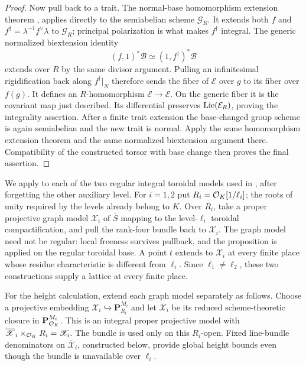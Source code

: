\begin{proof}
Now pull back to a trait. The normal-base homomorphism extension
theorem \cite[Chapter~I, Proposition~2.7]{FaltingsChai1990},
\cite[Proposition~3.3.1.5]{Lan2013} applies directly to the
semiabelian scheme $\mathcal G_R$. It extends both $f$ and
$f^\dagger=\lambda^{-1}f^\vee\lambda$ to $\mathcal G_R$;
principal polarization is what makes $f^\dagger$ integral.
The generic normalized biextension identity
\begin{equation}\label{ht:adjoint-biextension}
 (f,1)^*\mathscr B\simeq(1,f^\dagger)^*\mathscr B
\end{equation}
extends over $R$ by the same divisor argument. Pulling an
infinitesimal rigidification back along $f^\dagger|_N$ therefore
sends the fiber of $\mathcal E$ over $g$ to its fiber over $f(g)$.
It defines an $R$-homomorphism $\mathcal E\to\mathcal E$.
On the generic fiber it is the covariant map just described.
Its differential preserves $\operatorname{Lie}(\mathcal E_R)$, proving the
integrality assertion. After a finite trait extension the base-changed
group scheme is again semiabelian and the new trait is normal.
Apply the same homomorphism extension theorem and the same normalized
biextension argument there. Compatibility of the constructed torsor
with base change then proves the final assertion.
\end{proof}

We apply  to each of the two regular integral
toroidal models used in , after forgetting the other
auxiliary level. For $i=1,2$ put
$R_i=\mathcal O_K[1/\ell_i]$; the roots of unity required by the levels
already belong to $K$. Over $R_i$, take a proper projective graph
model $\mathscr X_i$ of $\overline S$ mapping to the level-$\ell_i$
toroidal compactification, and pull the rank-four bundle back to
$\mathscr X_i$. The graph model need not be regular: local freeness
survives pullback, and the proposition is applied on the regular
toroidal base. A point $t$ extends to $\mathscr X_i$ at every finite
place whose residue characteristic is different from $\ell_i$.
Since $\ell_1\ne\ell_2$, these two constructions supply a lattice
at every finite place.

For the height calculation, extend each graph model separately as
follows. Choose a projective embedding
$\mathscr X_i\hookrightarrow\mathbf P^{M_i}_{R_i}$ and let
$\overline{\mathscr X}_i$ be its reduced scheme-theoretic closure in
$\mathbf P^{M_i}_{\mathcal O_K}$. This is an integral proper projective
model with
$\overline{\mathscr X}_i\times_{\mathcal O_K}R_i=\mathscr X_i$.
The bundle is used only on this $R_i$-open. Fixed line-bundle
denominators on $\overline{\mathscr X}_i$, constructed below, provide
global height bounds even though the bundle is unavailable over
$\ell_i$.

